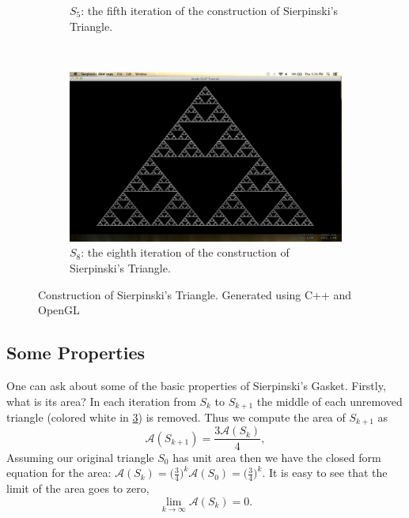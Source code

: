 \documentclass[11pt,oneside,final]{article}
\begin{document}
\begin{figure}[ht]
\begin{subfigure}[b]{0.22\textwidth}
		\caption{\(S_5\): the fifth iteration of the construction of 
		Sierpinski's Triangle.}
		\label{fig:sierptri3}
	\end{subfigure}
	~
	\begin{subfigure}[b]{0.22\textwidth}
		\includegraphics[width=\textwidth]{sierp8}
		\caption{\(S_8\): the eighth iteration of the construction of 
		Sierpinski's Triangle.}
		\label{fig:sierptri3}
	\end{subfigure}
	\caption{Construction of Sierpinski's Triangle. Generated using C++ and
	OpenGL}\label{fig:sierp-tri-construction}
\end{figure}

\subsection{Some Properties}
One can ask about some of the basic properties of Sierpinski's Gasket. Firstly,
what is its area?  In each iteration from \(S_k\) to \(S_{k+1}\) the middle of
each unremoved triangle (colored white in \ref{fig:sierp-tri-construction}) is removed.
Thus we compute the area of \(S_{k+1}\) as
\[\mathcal A(S_{k+1}) = \frac{3 \mathcal A(S_k)}{4},\]
Assuming our original triangle \(S_0\) has unit area then we have the closed
form equation for the area: \(\mathcal A(S_k) = \big(\frac{3}{4}\big)^k\mathcal
A(S_0) = \big(\frac{3}{4}\big)^k\).  It is easy to see that the limit of
the area goes to zero,
\[\lim_{k \rightarrow \infty}\mathcal A(S_k) = 0.\]
\end{document}
